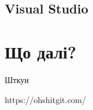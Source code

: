 \documentclass[aspectratio=169]{beamer}
\begin{document}
\subsection{Visual Studio}

\section{Що далі?}

\begin{frame}{Шткуи}

https://ohshitgit.com/

\end{frame}
\end{document}

